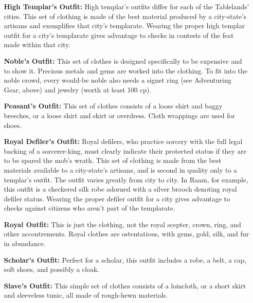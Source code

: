 \textbf{High Templar's Outfit:} High templar's outfits differ for each of the Tablelands' cities. This set of clothing is made of the best material produced by a city-state's artisans and exemplifies that city's templarate. Wearing the proper high templar outfit for a city's templarate gives advantage to  checks in contests of the  feat made within that city.


\textbf{Noble's Outfit:} This set of clothes is designed specifically to be expensive and to show it. Precious metals and gems are worked into the clothing. To fit into the noble crowd, every would-be noble also needs a signet ring (see Adventuring Gear, above) and jewelry (worth at least 100 cp).

\textbf{Peasant's Outfit:} This set of clothes consists of a loose shirt and baggy breeches, or a loose shirt and skirt or overdress. Cloth wrappings are used for shoes.

\textbf{Royal Defiler's Outfit:} Royal defilers, who practice sorcery with the full legal backing of a sorcerer-king, must clearly indicate their protected status if they are to be spared the mob's wrath. This set of clothing is made from the best materials available to a city-state's artisans, and is second in quality only to a templar's outfit. The outfit varies greatly from city to city. In Raam, for example, this outfit is a checkered silk robe adorned with a silver brooch denoting royal defiler status. Wearing the proper defiler outfit for a city gives advantage to  checks against citizens who aren't part of the templarate.

\textbf{Royal Outfit:} This is just the clothing, not the royal scepter, crown, ring, and other accoutrements. Royal clothes are ostentatious, with gems, gold, silk, and fur in abundance.

\textbf{Scholar's Outfit:} Perfect for a scholar, this outfit includes a robe, a belt, a cap, soft shoes, and possibly a cloak.

\textbf{Slave's Outfit:} This simple set of clothes consists of a loincloth, or a short skirt and sleeveless tunic, all made of rough-hewn materials.

